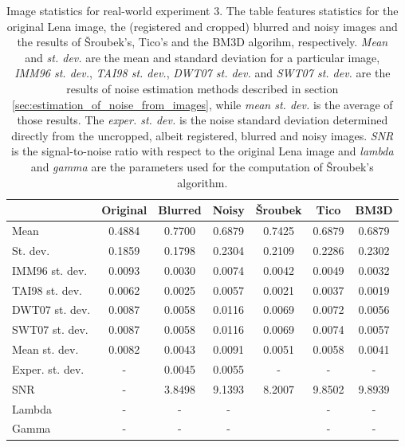 \documentclass[12pt,notitlepage]{report}
\begin{document}
\begin{table}[htb]
	\centering
	\begin{tabular}{ | l | c | c | c | c | c | c | }
	\hline
		           & Original & Blurred & Noisy  & Šroubek & Tico   & BM3D   \\ \hline 
	Mean           & 0.4884   & 0.7700  & 0.6879 & 0.7425  & 0.6879 & 0.6879 \\ \hline 
	St. dev.       & 0.1859   & 0.1798  & 0.2304 & 0.2109  & 0.2286 & 0.2302 \\ \hline 
	IMM96 st. dev. & 0.0093   & 0.0030  & 0.0074 & 0.0042  & 0.0049 & 0.0032 \\ \hline 
	TAI98 st. dev. & 0.0062   & 0.0025  & 0.0057 & 0.0021  & 0.0037 & 0.0019 \\ \hline 
	DWT07 st. dev. & 0.0087   & 0.0058  & 0.0116 & 0.0069  & 0.0072 & 0.0056 \\ \hline 
	SWT07 st. dev. & 0.0087   & 0.0058  & 0.0116 & 0.0069  & 0.0074 & 0.0057 \\ \hline 
	Mean st. dev.  & 0.0082   & 0.0043  & 0.0091 & 0.0051  & 0.0058 & 0.0041 \\ \hline 
	Exper. st. dev.& -        & 0.0045  & 0.0055 & -       & -      & -      \\ \hline 
	SNR            & -        & 3.8498  & 9.1393 & 8.2007  & 9.8502 & 9.8939 \\ \hline 
	Lambda         & -        & -       & -      &         & -      & -      \\ \hline 
	Gamma          & -        & -       & -      &         & -      & -      \\ \hline 

	\end{tabular}
	\caption[Image statistics for real-world experiment 3]{Image statistics for real-world experiment 3. The table features statistics for the original Lena image, the (registered and cropped) blurred and noisy images and the results of Šroubek's, Tico's and the BM3D algorihm, respectively. {\em Mean} and {\em st. dev.} are the mean and standard deviation for a particular image, {\em IMM96 st. dev.}, {\em TAI98 st. dev.}, {\em DWT07 st. dev.} and {\em SWT07 st. dev.} are the results of noise estimation methods described in section \ref{sec:estimation_of_noise_from_images}, while {\em mean st. dev.} is the average of those results. The {\em exper. st. dev.} is the noise standard deviation determined directly from the uncropped, albeit registered, blurred and noisy images. {\em SNR} is the signal-to-noise ratio with respect to the original Lena image and {\em lambda} and {\em gamma} are the parameters used for the computation of Šroubek's algorithm.}
	\label{tab:experiment_003_statistics}
\end{table}
\end{document}

